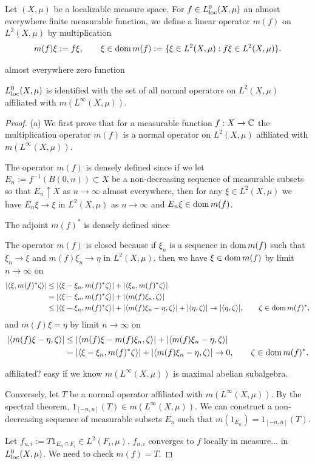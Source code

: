 \documentclass{../../large}
\begin{document}
\begin{prb}
Let $(X,\mu)$ be a localizable measure space.
For $f\in L_{\mathrm{loc}}^0(X,\mu)$ an almost everywhere finite measurable function, we define a linear operator $m(f)$ on $L^2(X,\mu)$ by multiplication
\[m(f)\xi:=f\xi,\qquad \xi\in\operatorname{dom} m(f):=\{\xi\in L^2(X,\mu):f\xi\in L^2(X,\mu)\}.\]

almost everywhere zero function
\begin{parts}
\item $L^0_{\mathrm{loc}}(X,\mu)$ is identified with the set of all normal operators on $L^2(X,\mu)$ affiliated with $m(L^\infty(X,\mu))$.
\end{parts}
\end{prb}
\begin{proof}
(a)
We first prove that for a measurable function $f:X\to\mathbb{C}$ the multiplication operator $m(f)$ is a normal operator on $L^2(X,\mu)$ affiliated with $m(L^\infty(X,\mu))$.

The operator $m(f)$ is densely defined since if we let $E_n:=f^{-1}(B(0,n))\subset X$ be a non-decreasing sequence of measurable subsets so that $E_n\uparrow X$ as $n\to\infty$ almost everywhere, then for any $\xi\in L^2(X,\mu)$ we have $E_n\xi\to\xi$ in $L^2(X,\mu)$ as $n\to\infty$ and $E_n\xi\in\operatorname{dom} m(f)$.

The adjoint $m(f)^*$ is densely defined since

The operator $m(f)$ is closed because if $\xi_n$ is a sequence in $\operatorname{dom} m(f)$ such that $\xi_n\to\xi$ and $m(f)\xi_n\to\eta$ in $L^2(X,\mu)$, then we have $\xi\in\operatorname{dom} m(f)$ by limit $n\to\infty$ on
\begin{align*}
|\langle\xi,m(f)^*\zeta\rangle|
&\le|\langle\xi-\xi_n,m(f)^*\zeta\rangle|+|\langle\xi_n,m(f)^*\zeta\rangle|\\
&=|\langle\xi-\xi_n,m(f)^*\zeta\rangle|+|\langle m(f)\xi_n,\zeta\rangle|\\
&\le|\langle\xi-\xi_n,m(f)^*\zeta\rangle|+|\langle m(f)\xi_n-\eta,\zeta\rangle|+|\langle\eta,\zeta\rangle|\to|\langle\eta,\zeta\rangle|,\qquad\zeta\in\operatorname{dom} m(f)^*,
\end{align*}
and $m(f)\xi=\eta$ by limit $n\to\infty$ on
\begin{align*}
|\langle m(f)\xi-\eta,\zeta\rangle|
&\le|\langle m(f)\xi-m(f)\xi_n,\zeta\rangle|+|\langle m(f)\xi_n-\eta,\zeta\rangle|\\
&=|\langle\xi-\xi_n,m(f)^*\zeta\rangle|+|\langle m(f)\xi_n-\eta,\zeta\rangle|\to0,\qquad\zeta\in\operatorname{dom} m(f)^*.
\end{align*}

affiliated? easy if we know $m(L^\infty(X,\mu))$ is maximal abelian subalgebra.


Conversely, let $T$ be a normal operator affiliated with $m(L^\infty(X,\mu))$.
By the spectral theorem, $1_{[-n,n]}(T)\in m(L^\infty(X,\mu))$.
We can construct a non-decreasing sequence of measurable subsets $E_n$ such that $m(1_{E_n})=1_{[-n,n]}(T)$.



Let $f_{n,i}:=T1_{E_n\cap F_i}\in L^2(F_i,\mu)$.
$f_{n,i}$ converges to $f$ locally in measure... in $L^0_{\mathrm{loc}}(X,\mu)$.
We need to check $m(f)=T$.

\end{proof}
\end{document}
